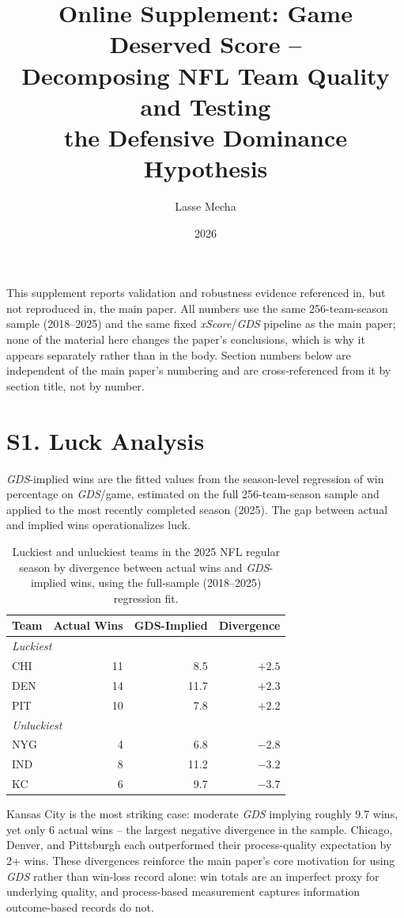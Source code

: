 \documentclass[12pt,a4paper]{article}
\title{Online Supplement: Game Deserved Score --\\Decomposing NFL Team Quality and Testing\\the Defensive Dominance Hypothesis}
\author{Lasse Mecha}
\date{2026}
\newcommand{\xscore}{\textit{xScore}}
\newcommand{\gds}{\textit{GDS}}
\begin{document}
\maketitle

\noindent This supplement reports validation and robustness evidence referenced in, but not
reproduced in, the main paper. All numbers use the same 256-team-season sample (2018--2025)
and the same fixed \xscore{}/\gds{} pipeline as the main paper; none of the material here
changes the paper's conclusions, which is why it appears separately rather than in the body.
Section numbers below are independent of the main paper's numbering and are cross-referenced
from it by section title, not by number.

\section*{S1. Luck Analysis}

\gds{}-implied wins are the fitted values from the season-level regression of win percentage
on \gds{}/game, estimated on the full 256-team-season sample and applied to the most recently
completed season (2025). The gap between actual and implied wins operationalizes luck.

\begin{table}[htbp]
  \centering
  \caption{Luckiest and unluckiest teams in the 2025 NFL regular season by divergence between
  actual wins and \gds{}-implied wins, using the full-sample (2018--2025) regression fit.}
  \begin{tabular}{lrrr}
    \toprule
    \textbf{Team} & \textbf{Actual Wins} & \textbf{GDS-Implied} & \textbf{Divergence} \\
    \midrule
    \multicolumn{4}{l}{\textit{Luckiest}} \\[2pt]
    CHI & 11 & 8.5  & $+2.5$ \\
    DEN & 14 & 11.7 & $+2.3$ \\
    PIT & 10 & 7.8  & $+2.2$ \\[6pt]
    \multicolumn{4}{l}{\textit{Unluckiest}} \\[2pt]
    NYG &  4 & 6.8  & $-2.8$ \\
    IND &  8 & 11.2 & $-3.2$ \\
    KC  &  6 & 9.7  & $-3.7$ \\
    \bottomrule
  \end{tabular}
\end{table}

Kansas City is the most striking case: moderate \gds{} implying roughly 9.7 wins, yet only 6
actual wins -- the largest negative divergence in the sample. Chicago, Denver, and Pittsburgh
each outperformed their process-quality expectation by 2+ wins. These divergences reinforce the
main paper's core motivation for using \gds{} rather than win-loss record alone: win totals are
an imperfect proxy for underlying quality, and process-based measurement captures information
outcome-based records do not.
\end{document}
